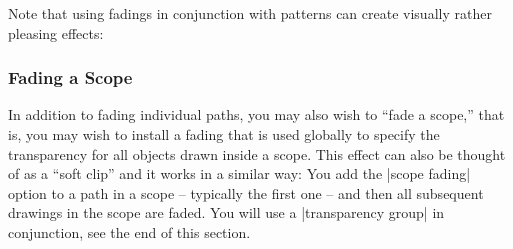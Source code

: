 Note that using fadings in conjunction with patterns can create
visually rather pleasing effects:
\begin{codeexample}[]
\tikzfading[name=middle,
            top color=transparent!50,
            bottom color=transparent!50,
            middle color=transparent!20]
\end{codeexample}


\subsubsection{Fading a Scope}

In addition to fading individual paths, you may also wish to ``fade a
scope,'' that is, you may wish to install a fading that is used
globally to specify the transparency for all objects drawn inside a
scope. This effect can also be thought of as a ``soft clip'' and it
works in a similar way: You add the |scope fading| option to a path in
a scope -- typically the first one -- and then all subsequent drawings
in the scope are faded. You will use a |transparency group| in
conjunction, see the end of this section.

